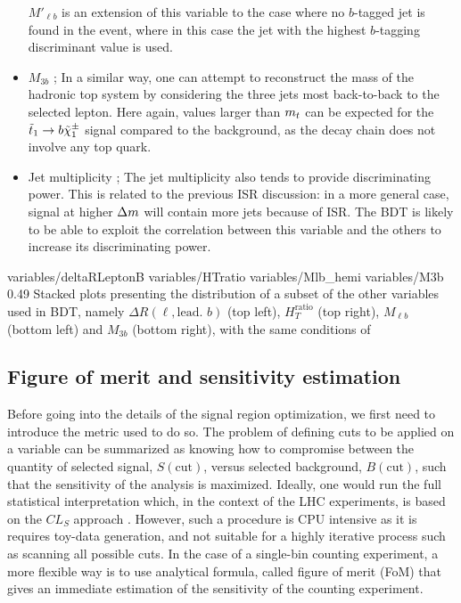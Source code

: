 \begin{itemize}
            $M'_{\ell b}$ is an extension of this variable to the case where no $b$-tagged
            jet is found in the event, where in this case the jet with the highest
            $b$-tagging discriminant value is used.
        \item $M_{3b}$ ; In a similar way, one can attempt to reconstruct the mass of the
            hadronic top system by considering the three jets most back-to-back to the selected
            lepton. Here again, values larger than $m_{t}$ can be expected for the $\tilde{t}_1
            \rightarrow b \tilde{\chi}_1^\pm$ signal compared to the background, as the decay chain
            does not involve any top quark.
        \item Jet multiplicity ; The jet multiplicity also tends to provide discriminating power.
            This is related to the previous ISR discussion: in a more general case, signal
            at higher $\Delta m$ will contain more jets because of ISR. The BDT is likely to
            be able to exploit the correlation between this variable and the others to
            increase its discriminating power.
    \end{itemize}

                      {variables/deltaRLeptonB}
                      {variables/HTratio}
                      {variables/Mlb_hemi}
                      {variables/M3b}
                      {0.49}
                      {Stacked plots presenting the distribution of a subset of
                      the other variables used in BDT, namely $\Delta R( \ell, \text{lead. } b)$
                      (top left), $H_{T}^\text{ratio}$ (top right), $M_{\ell b}$ (bottom
                      left) and $M_{3b}$ (bottom right), with the same conditions of
                      }

    \subsection{Figure of merit and sensitivity estimation \label{sec:FoMdiscussion}}

    Before going into the details of the signal region optimization, we first need to
    introduce the metric used to do so. The problem of defining cuts to be applied on a
    variable can be summarized as knowing how to compromise between the quantity of
    selected signal, $S(\text{cut})$, versus selected background, $B(\text{cut})$, such
    that the sensitivity of the analysis is maximized. Ideally, one would run the full
    statistical interpretation which, in the context of the LHC experiments, is based
    on the $CL_S$ approach \cite{CLs}. However, such a procedure is CPU intensive as it is
    requires toy-data generation, and not suitable for a highly iterative process such
    as scanning all possible cuts. In the case of a single-bin counting experiment, a more
    flexible way is to use analytical formula, called figure of merit (FoM) that gives an
    immediate estimation of the sensitivity of the counting experiment.

